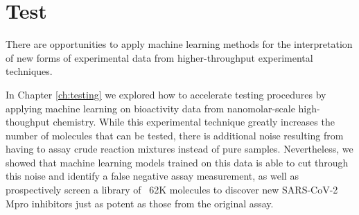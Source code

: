 \section*{Test}

There are opportunities to apply machine learning methods for the interpretation of new forms of experimental data from higher-throughput experimental techniques.

In Chapter \ref{ch:testing} we explored how to accelerate testing procedures by applying machine learning on bioactivity data from nanomolar-scale high-thoughput chemistry. While this experimental technique greatly increases the number of molecules that can be tested, there is additional noise resulting from having to assay crude reaction mixtures instead of pure samples. Nevertheless, we showed that machine learning models trained on this data is able to cut through this noise and identify a false negative assay measurement, as well as prospectively screen a library of ~62K molecules to discover new SARS-CoV-2 Mpro inhibitors just as potent as those from the original assay.



